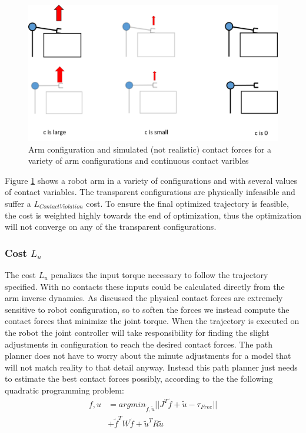 \documentclass[../thesis.tex]{subfiles}
\begin{document}
\begin{figure}
  \centering
  \includegraphics[width=.7\linewidth]{./Planning/ContactArms.png}
  \caption{Arm configuration and simulated (not realistic) contact forces for a variety of arm configurations and continuous contact varibles}
  \label{fig:ContactArms}
\end{figure}

Figure \ref{fig:ContactArms} shows a robot arm in a variety of configurations and with several values of contact variables.
The transparent configurations are physically infeasible and suffer a $L_{Contact Violation}$ cost.
To ensure the final optimized trajectory is feasible, the cost is weighted highly towards the end of optimization, thus the optimization will not converge on any of the transparent configurations.


\subsubsection{Cost $L_u$}

The cost $L_u$ penalizes the input torque necessary to follow the trajectory specified. With no contacts these inputs could be calculated directly from the arm inverse dynamics. As discussed the physical contact forces are extremely sensitive to robot configuration, so to soften the forces we instead compute the contact forces that minimize the joint torque. When the trajectory is executed on the robot the joint controller will take responsibility for finding the slight adjustments in configuration to reach the desired contact forces. The path planner does not have to worry about the minute adjustments for a model that will not match reality to that detail anyway. Instead this path planner just needs to estimate the best contact forces possibly, according to the the following quadratic programming problem:
\begin{align*}
f, u &= argmin_{\tilde{f}, \tilde{u}} ||J^T\tilde{f} + \tilde{u} - \tau_{Free}|| \\
&+ \tilde{f}^T W \tilde{f} + \tilde{u}^T R \tilde{u}
\end{align*}
\end{document}

